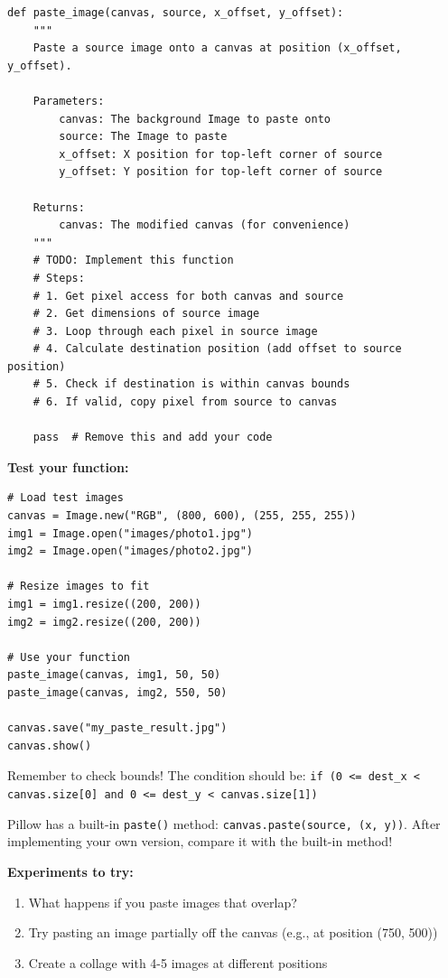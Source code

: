 \documentclass[11pt]{article}
\begin{document}
\begin{lstlisting}
def paste_image(canvas, source, x_offset, y_offset):
    """
    Paste a source image onto a canvas at position (x_offset, y_offset).

    Parameters:
        canvas: The background Image to paste onto
        source: The Image to paste
        x_offset: X position for top-left corner of source
        y_offset: Y position for top-left corner of source

    Returns:
        canvas: The modified canvas (for convenience)
    """
    # TODO: Implement this function
    # Steps:
    # 1. Get pixel access for both canvas and source
    # 2. Get dimensions of source image
    # 3. Loop through each pixel in source image
    # 4. Calculate destination position (add offset to source position)
    # 5. Check if destination is within canvas bounds
    # 6. If valid, copy pixel from source to canvas

    pass  # Remove this and add your code
\end{lstlisting}

\textbf{Test your function:}

\begin{lstlisting}
# Load test images
canvas = Image.new("RGB", (800, 600), (255, 255, 255))
img1 = Image.open("images/photo1.jpg")
img2 = Image.open("images/photo2.jpg")

# Resize images to fit
img1 = img1.resize((200, 200))
img2 = img2.resize((200, 200))

# Use your function
paste_image(canvas, img1, 50, 50)
paste_image(canvas, img2, 550, 50)

canvas.save("my_paste_result.jpg")
canvas.show()
\end{lstlisting}

\begin{hint}
Remember to check bounds! The condition should be:
\texttt{if (0 <= dest\_x < canvas.size[0] and 0 <= dest\_y < canvas.size[1])}
\end{hint}

\begin{note}
Pillow has a built-in \texttt{paste()} method: \texttt{canvas.paste(source, (x, y))}. After implementing your own version, compare it with the built-in method!
\end{note}

\textbf{Experiments to try:}
\begin{enumerate}
    \item What happens if you paste images that overlap?
    \item Try pasting an image partially off the canvas (e.g., at position (750, 500))
    \item Create a collage with 4-5 images at different positions
\end{enumerate}
\end{document}
